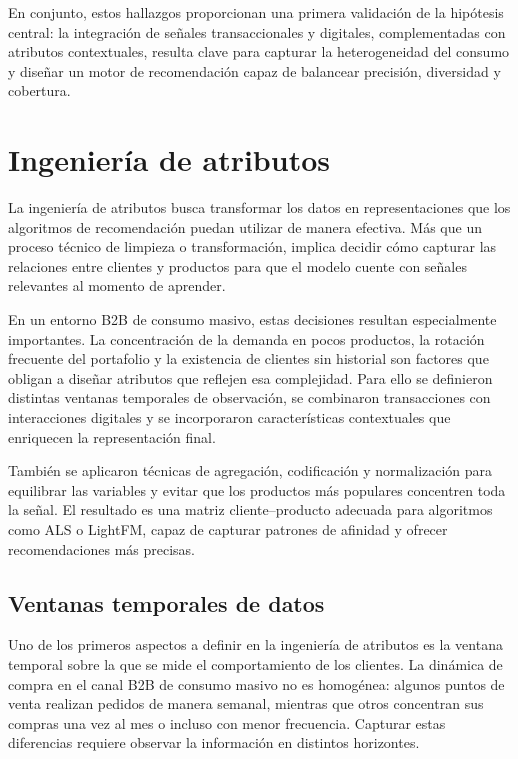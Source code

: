 En conjunto, estos hallazgos proporcionan una primera validación de la hipótesis central: la integración de señales transaccionales y digitales, complementadas con atributos contextuales, resulta clave para capturar la heterogeneidad del consumo y diseñar un motor de recomendación capaz de balancear precisión, diversidad y cobertura.


\section{Ingeniería de atributos}

La ingeniería de atributos busca transformar los datos en representaciones que los algoritmos de recomendación puedan utilizar de manera efectiva. Más que un proceso técnico de limpieza o transformación, implica decidir cómo capturar las relaciones entre clientes y productos para que el modelo cuente con señales relevantes al momento de aprender.

En un entorno B2B de consumo masivo, estas decisiones resultan especialmente importantes. La concentración de la demanda en pocos productos, la rotación frecuente del portafolio y la existencia de clientes sin historial son factores que obligan a diseñar atributos que reflejen esa complejidad. Para ello se definieron distintas ventanas temporales de observación, se combinaron transacciones con interacciones digitales y se incorporaron características contextuales que enriquecen la representación final.

También se aplicaron técnicas de agregación, codificación y normalización para equilibrar las variables y evitar que los productos más populares concentren toda la señal. El resultado es una matriz cliente–producto adecuada para algoritmos como ALS o LightFM, capaz de capturar patrones de afinidad y ofrecer recomendaciones más precisas.

\subsection{Ventanas temporales de datos}
Uno de los primeros aspectos a definir en la ingeniería de atributos es la ventana temporal sobre la que se mide el comportamiento de los clientes. La dinámica de compra en el canal B2B de consumo masivo no es homogénea: algunos puntos de venta realizan pedidos de manera semanal, mientras que otros concentran sus compras una vez al mes o incluso con menor frecuencia. Capturar estas diferencias requiere observar la información en distintos horizontes.

